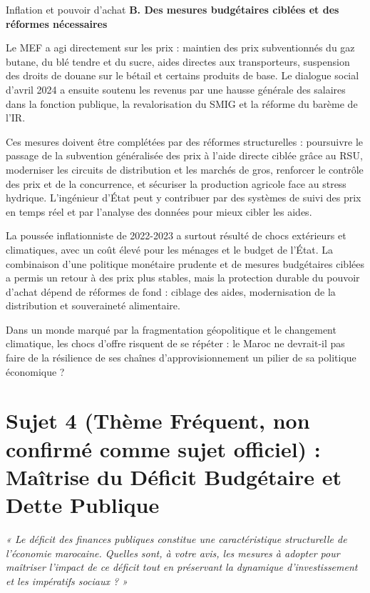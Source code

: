 \begin{copiemodele}{Inflation et pouvoir d'achat}
\textbf{B. Des mesures budgétaires ciblées et des réformes nécessaires}

Le MEF a agi directement sur les prix : maintien des prix subventionnés du gaz butane, du blé tendre et du sucre, aides directes aux transporteurs, suspension des droits de douane sur le bétail et certains produits de base. Le dialogue social d'avril 2024 a ensuite soutenu les revenus par une hausse générale des salaires dans la fonction publique, la revalorisation du SMIG et la réforme du barème de l'IR.

Ces mesures doivent être complétées par des réformes structurelles : poursuivre le passage de la subvention généralisée des prix à l'aide directe ciblée grâce au RSU, moderniser les circuits de distribution et les marchés de gros, renforcer le contrôle des prix et de la concurrence, et sécuriser la production agricole face au stress hydrique. L'ingénieur d'État peut y contribuer par des systèmes de suivi des prix en temps réel et par l'analyse des données pour mieux cibler les aides.

La poussée inflationniste de 2022-2023 a surtout résulté de chocs extérieurs et climatiques, avec un coût élevé pour les ménages et le budget de l'État. La combinaison d'une politique monétaire prudente et de mesures budgétaires ciblées a permis un retour à des prix plus stables, mais la protection durable du pouvoir d'achat dépend de réformes de fond : ciblage des aides, modernisation de la distribution et souveraineté alimentaire.

Dans un monde marqué par la fragmentation géopolitique et le changement climatique, les chocs d'offre risquent de se répéter : le Maroc ne devrait-il pas faire de la résilience de ses chaînes d'approvisionnement un pilier de sa politique économique ?
\end{copiemodele}

\section{Sujet 4 (Thème Fréquent, non confirmé comme sujet officiel) : Maîtrise du Déficit Budgétaire et Dette Publique}

\begin{tcolorbox}[colback=blue!5!white,colframe=blue!75!black,title=\textbf{Énoncé Type (thème récurrent des concours MEF --- aucune source officielle ne confirme ce sujet)}]
\textit{« Le déficit des finances publiques constitue une caractéristique structurelle de l'économie marocaine. Quelles sont, à votre avis, les mesures à adopter pour maîtriser l'impact de ce déficit tout en préservant la dynamique d'investissement et les impératifs sociaux ? »}
\end{tcolorbox}

